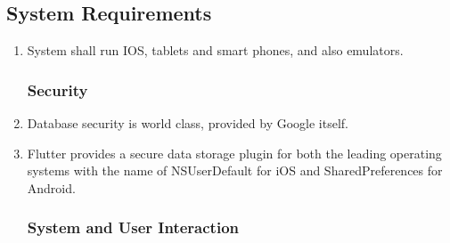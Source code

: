 \documentclass[12pt]{article}
\begin{document}
\subsection{System Requirements}
\begin{enumerate}
\subsubsection*{Portability}
\item System shall run IOS, tablets and smart phones, and also emulators.
\subsubsection*{Security}
\item Database security is world class, provided by Google itself.
\item Flutter provides a secure data storage plugin for both the leading operating systems with the name of NSUserDefault for iOS and SharedPreferences for Android.
\subsubsection*{System and User Interaction}


\end{enumerate}
\end{document}
